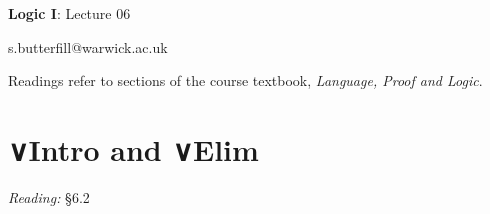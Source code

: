 \documentclass[12pt]{extarticle}
\date{}
\makeatletter
\def \ititle {Origins of Mind}
\def \isubtitle {Lecture 08}
\def \iemail{s.butterfill@warwick.ac.uk}
\makeatother
\begin{document}

\begin{multicols*}{3}

\setlength\footnotesep{1em}








\def \ititle {Logic I}
 
\def \isubtitle {Lecture 06}
 
\begin{center}
 
{\Large
 
\textbf{\ititle}: \isubtitle
 
}
 
 
 
\iemail %
 
\end{center}
 
Readings refer to sections of the course textbook, \emph{Language, Proof and Logic}.
 
 
 
\section{∨Intro and ∨Elim}
 
\emph{Reading:} §6.2
 

\end{multicols*}
\end{document}
